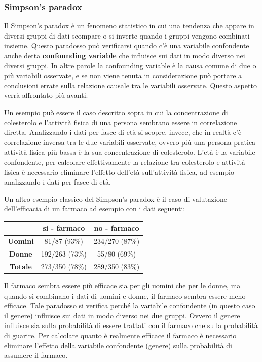 \subsubsection*{Simpson's paradox}
Il Simpson's paradox è un fenomeno statistico in cui una tendenza che appare in diversi gruppi di dati scompare o si inverte
quando i gruppi vengono combinati insieme. Questo paradosso può verificarsi quando c'è una variabile confondente anche detta
\textbf{confounding variable} che influisce sui dati in modo diverso nei diversi gruppi. In altre parole la confounding variable
è la causa comune di due o più variabili osservate, e se non viene tenuta in considerazione può portare a conclusioni errate
sulla relazione causale tra le variabili osservate. Questo aspetto verrà affrontato più avanti.

Un esempio può essere il caso descritto sopra in cui la concentrazione di colesterolo e l'attività fisica di una persona sembrano
essere in correlazione diretta. Analizzando i dati per fasce di età si scopre, invece, che in realtà c'è correlazione inversa
tra le due variabili osservate, ovvero più una persona pratica attività fisica più bassa è la sua concentrazione di colesterolo.
L'età è la variabile confondente, per calcolare effettivamente la relazione tra colesterolo e attività fisica è necessario
eliminare l'effetto dell'età sull'attività fisica, ad esempio analizzando i dati per fasce di età.

Un altro esempio classico del Simpson's paradox è il caso di valutazione dell'efficacia di un farmaco ad esempio con i dati
seguenti:
\begin{center}
	\begin{tabular}{c|c c}
		& \textbf{si - farmaco} & \textbf{no - farmaco} \\
		\midrule
		\textbf{Uomini} & 81/87 (93\%) & 234/270 (87\%) \\
		\textbf{Donne} & 192/263 (73\%) & 55/80 (69\%) \\
		\midrule
		\textbf{Totale} & 273/350 (78\%) & 289/350 (83\%) \\
		\bottomrule
	\end{tabular}
\end{center}
Il farmaco sembra essere più efficace sia per gli uomini che per le donne, ma quando si combinano i dati di uomini e donne,
il farmaco sembra essere meno efficace. Tale paradosso si verifica perché la variabile confondente (in questo caso il genere)
influisce sui dati in modo diverso nei due gruppi. Ovvero il genere influisce sia sulla probabilità di essere trattati con il
farmaco che sulla probabilità di guarire. Per calcolare quanto è realmente efficace il farmaco è necessario eliminare l'effetto
della variabile confondente (genere) sulla probabilità di assumere il farmaco.

